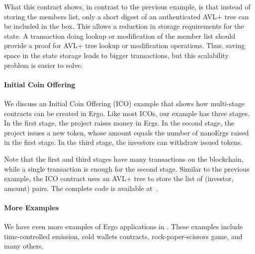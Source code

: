  What this contract shows, in contrast to the previous example, is that instead of storing the members list, only a short digest of an authenticated AVL+ tree can be included in the box. This allows a reduction in storage requirements for the state. A transaction doing lookup or modification of the member list should provide a proof for AVL+ tree lookup or modification operations. Thus, saving space in the state storage leads to bigger transactions, but this scalability problem is easier to solve.

\paragraph{Initial Coin Offering}

 We discuss an Initial Coin Offering (ICO) example that shows how multi-stage contracts can be created in Ergo. Like most ICOs, our example has three stages. In the first stage, the project raises money in Ergs. In the second stage, the project issues a new token, whose amount equals the number of nanoErgs raised in the first stage. In the third stage, the investors can withdraw issued tokens.

 Note that the first and third stages have many transactions on
 the blockchain, while a single transaction is enough for the second stage. Similar to the previous example, the ICO contract uses an AVL+ tree to store the list of (investor, amount) pairs. The complete code is available at~\cite{icoTutorial}.


\paragraph{More Examples}

 We have even more examples of Ergo applications in \cite{ergoTutorial, ergoAdvTutorial}. These examples include time-controlled emission, cold wallets contracts, rock-paper-scissors game, and many others.